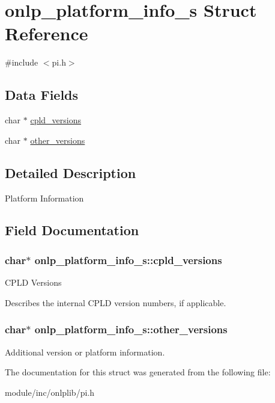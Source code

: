 \hypertarget{structonlp__platform__info__s}{\section{onlp\+\_\+platform\+\_\+info\+\_\+s Struct Reference}
\label{structonlp__platform__info__s}
}


{\ttfamily \#include $<$pi.\+h$>$}

\subsection*{Data Fields}
\begin{DoxyCompactItemize}
\item 
char $\ast$ \hyperlink{structonlp__platform__info__s_ae6e44f3d65c0e5911073aec2ede8964b}{cpld\+\_\+versions}
\item 
char $\ast$ \hyperlink{structonlp__platform__info__s_a0b238c4f78e3dbf2321e38f6501eeb42}{other\+\_\+versions}
\end{DoxyCompactItemize}


\subsection{Detailed Description}
Platform Information 

\subsection{Field Documentation}
\hypertarget{structonlp__platform__info__s_ae6e44f3d65c0e5911073aec2ede8964b}{
\subsubsection[{cpld\+\_\+versions}]{\setlength{\rightskip}{0pt plus 5cm}char$\ast$ onlp\+\_\+platform\+\_\+info\+\_\+s\+::cpld\+\_\+versions}}\label{structonlp__platform__info__s_ae6e44f3d65c0e5911073aec2ede8964b}
C\+P\+L\+D Versions

Describes the internal C\+P\+L\+D version numbers, if applicable. \hypertarget{structonlp__platform__info__s_a0b238c4f78e3dbf2321e38f6501eeb42}{
\subsubsection[{other\+\_\+versions}]{\setlength{\rightskip}{0pt plus 5cm}char$\ast$ onlp\+\_\+platform\+\_\+info\+\_\+s\+::other\+\_\+versions}}\label{structonlp__platform__info__s_a0b238c4f78e3dbf2321e38f6501eeb42}
Additional version or platform information. 

The documentation for this struct was generated from the following file\+:\begin{DoxyCompactItemize}
\item 
module/inc/onlplib/pi.\+h\end{DoxyCompactItemize}
